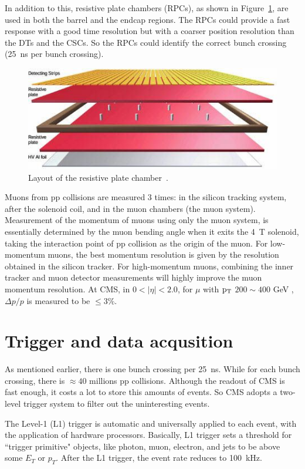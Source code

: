 In addition to this, resistive plate chambers (RPCs), as shown in Figure~\ref{fig:RPC}, are used in both the barrel and the endcap regions. The RPCs could provide a fast response with a good time resolution but with a coarser position resolution than the DTs and the CSCs.  So the RPCs could identify the correct bunch crossing (25~ns per bunch crossing). 

\begin{figure}[!htbp]
\centering
\includegraphics[width=.8\textwidth]{figures/RPC.jpg}
\caption{Layout of the resistive plate chamber~\cite{web:CSC}.}
\label{fig:RPC}
\end{figure}

Muons from pp collisions are measured 3 times: in the silicon tracking system, after the solenoid coil, and in the muon chambers (the muon system). 
Measurement of the momentum of muons using only the muon system, is essentially determined by the muon bending angle when it exits  the 4~T solenoid, taking the interaction point of pp collision as the origin of the muon.
For low-momentum muons, the best momentum resolution is given by the resolution 
obtained in the silicon tracker. For high-momentum muons, combining the inner tracker and muon detector measurements will highly improve the muon momentum resolution.  
At CMS, in $0 < |\eta| < 2.0 $, for $\mu$ with $\mathrm{p_{T}}$ $200{\sim}400$ GeV ,  $\Delta p / p$ is measured to be $\leq 3\%$.


\section{Trigger and data acqusition}

As mentioned earlier, there is one bunch crossing per 25~ns. While for each bunch crossing, there 
is ${\approx}40$ millions pp collisions. Although the readout of CMS is fast enough, it costs a lot to store 
this amounts of events. So CMS adopts a two-level trigger system to filter out the uninteresting events. 

The Level-1 (L1) trigger is automatic and universally applied to each event, with the application of hardware processors. Basically, L1 trigger sets a threshold for ``trigger primitive" objects, like photon, muon, electron, and jets to be above some $E_{T}$ or $p_{T}$.  After the L1 trigger, the event rate reduces to 100~kHz. 

